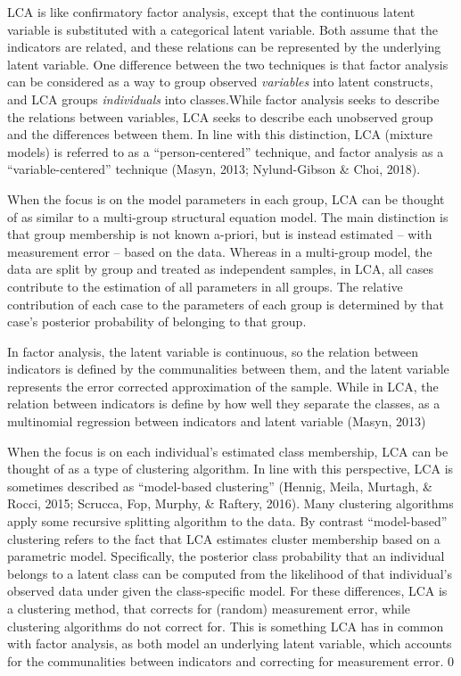 \documentclass[
  ,man,floatsintext]{apa6}
\begin{document}
LCA is like confirmatory factor analysis, except that the continuous
latent variable is substituted with a categorical latent variable. Both
assume that the indicators are related, and these relations can be
represented by the underlying latent variable. One difference between
the two techniques is that factor analysis can be considered as a way to
group observed \emph{variables} into latent constructs, and LCA groups
\emph{individuals} into classes.While factor analysis seeks to describe the
relations between variables, LCA seeks to describe each unobserved group
and the differences between them. In line with this distinction, LCA
(mixture models) is referred to as a ``person-centered'' technique, and
factor analysis as a ``variable-centered'' technique
(Masyn, 2013; Nylund-Gibson \& Choi, 2018).

When the focus is on the model parameters in each group, LCA can be
thought of as similar to a multi-group structural equation model. The
main distinction is that group membership is not known a-priori, but is
instead estimated -- with measurement error -- based on the data.
Whereas in a multi-group model, the data are split by group and treated
as independent samples, in LCA, all cases contribute to the estimation
of all parameters in all groups. The relative contribution of each case
to the parameters of each group is determined by that case's posterior
probability of belonging to that group.

In factor analysis, the latent variable is continuous, so the relation
between indicators is defined by the communalities between them, and the
latent variable represents the error corrected approximation of the
sample. While in LCA, the relation between indicators is define by how
well they separate the classes, as a multinomial regression between
indicators and latent variable (Masyn, 2013)

When the focus is on each individual's estimated class membership, LCA
can be thought of as a type of clustering algorithm. In line with this
perspective, LCA is sometimes described as ``model-based clustering''
(Hennig, Meila, Murtagh, \& Rocci, 2015; Scrucca, Fop, Murphy, \& Raftery, 2016). Many clustering
algorithms apply some recursive splitting algorithm to the data. By
contrast ``model-based'' clustering refers to the fact that LCA estimates
cluster membership based on a parametric model. Specifically, the
posterior class probability that an individual belongs to a latent class
can be computed from the likelihood of that individual's observed data
under given the class-specific model. For these differences, LCA is a clustering method, that corrects for (random) measurement error, while clustering algorithms do not correct for. This is something LCA has in common with factor analysis, as both model an underlying latent variable, which accounts for the communalities between indicators and correcting for measurement error. 0
\end{document}
